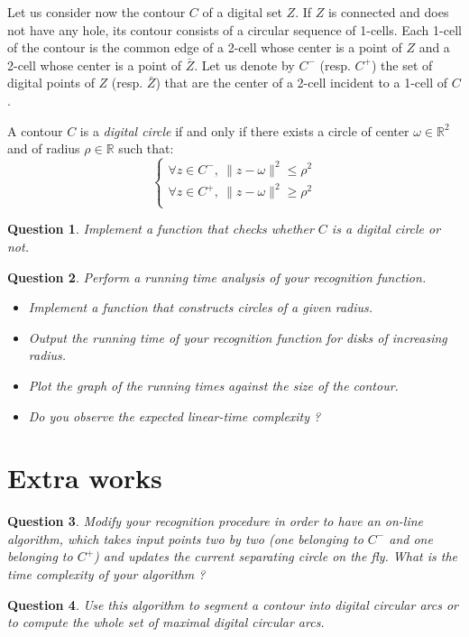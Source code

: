 \documentclass[a4paper, 11pt]{article}
\newtheorem{qu}{Question}
\begin{document}
Let us consider now the contour $C$ of a digital set $Z$. If $Z$ is connected
and does not have any hole, its contour consists of a circular sequence of 1-cells. 
Each 1-cell of the contour is the common edge of a 2-cell whose center is a point of $Z$ 
and a 2-cell whose center is a point of $\bar{Z}$. Let us denote by $C^-$ (resp. $C^+$)
the set of digital points of $Z$ (resp. $\bar{Z}$) that are the center of a 2-cell 
incident to a 1-cell of $C$.  
  
A contour $C$ is a \emph{digital circle} if and only if there exists a circle of 
center $\omega \in \mathbb{R}^2$ and of radius $\rho \in \mathbb{R}$ such that:  
\begin{equation}
  \left\{
  \begin{array}{l}
    \forall z \in C^-, \: \| z - \omega \|^2 \leq \rho^2 \\
    \forall z \in C^+, \: \| z - \omega \|^2 \geq \rho^2 \\
  \end{array}
  \right.
\end{equation}

\begin{qu}
Implement a function that checks whether $C$ is a digital circle or not. 
\end{qu}

\begin{qu}
  Perform a running time analysis of your recognition function.  
  \begin{itemize}
  \item Implement a function that constructs circles of a given radius.  
  \item Output the running time of your recognition function for disks of increasing radius. 
  \item Plot the graph of the running times against the size of the contour.
  \item Do you observe the expected linear-time complexity ?
  \end{itemize}	 
\end{qu}	

\section{Extra works}

\begin{qu}
Modify your recognition procedure in order to have an on-line algorithm, 
which takes input points two by two (one belonging to $C^-$ and one belonging to $C^+$)
 and updates the current separating circle on the fly.
What is the time complexity of your algorithm ?
\end{qu}

\begin{qu}
Use this algorithm to segment a contour into digital circular arcs or to compute
the whole set of maximal digital circular arcs.  
\end{qu}
\end{document}
